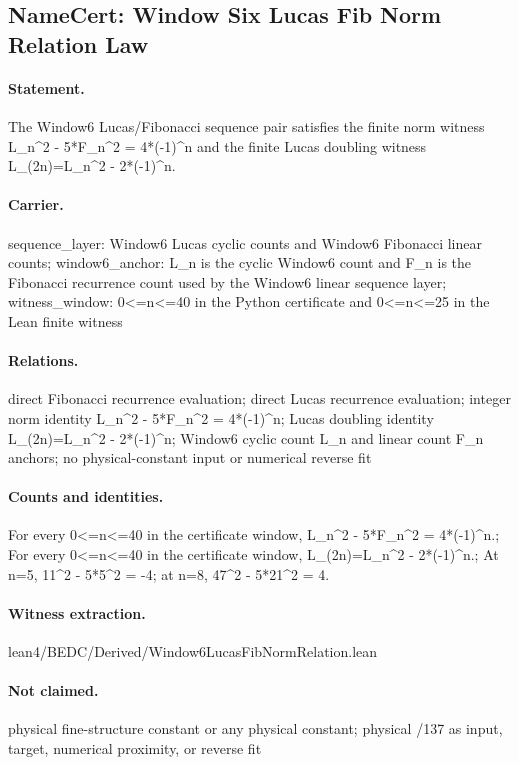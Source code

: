 \subsection{NameCert: Window Six Lucas Fib Norm Relation Law}
\label{sec:namecert-window6_lucas_fib_norm_relation_law_certificate}

\paragraph{Statement.} The Window6 Lucas/Fibonacci sequence pair satisfies the finite norm witness L\_n\textasciicircum{}2 - 5*F\_n\textasciicircum{}2 = 4*(-1)\textasciicircum{}n and the finite Lucas doubling witness L\_(2n)=L\_n\textasciicircum{}2 - 2*(-1)\textasciicircum{}n.

\paragraph{Carrier.} sequence\_layer: Window6 Lucas cyclic counts and Window6 Fibonacci linear counts; window6\_anchor: L\_n is the cyclic Window6 count and F\_n is the Fibonacci recurrence count used by the Window6 linear sequence layer; witness\_window: 0<=n<=40 in the Python certificate and 0<=n<=25 in the Lean finite witness

\paragraph{Relations.} direct Fibonacci recurrence evaluation; direct Lucas recurrence evaluation; integer norm identity L\_n\textasciicircum{}2 - 5*F\_n\textasciicircum{}2 = 4*(-1)\textasciicircum{}n; Lucas doubling identity L\_(2n)=L\_n\textasciicircum{}2 - 2*(-1)\textasciicircum{}n; Window6 cyclic count L\_n and linear count F\_n anchors; no physical-constant input or numerical reverse fit

\paragraph{Counts and identities.} For every 0<=n<=40 in the certificate window, L\_n\textasciicircum{}2 - 5*F\_n\textasciicircum{}2 = 4*(-1)\textasciicircum{}n.; For every 0<=n<=40 in the certificate window, L\_(2n)=L\_n\textasciicircum{}2 - 2*(-1)\textasciicircum{}n.; At n=5, 11\textasciicircum{}2 - 5*5\textasciicircum{}2 = -4; at n=8, 47\textasciicircum{}2 - 5*21\textasciicircum{}2 = 4.

\paragraph{Witness extraction.} lean4/BEDC/Derived/Window6LucasFibNormRelation.lean

\paragraph{Not claimed.} physical fine-structure constant or any physical constant; physical /137 as input, target, numerical proximity, or reverse fit
